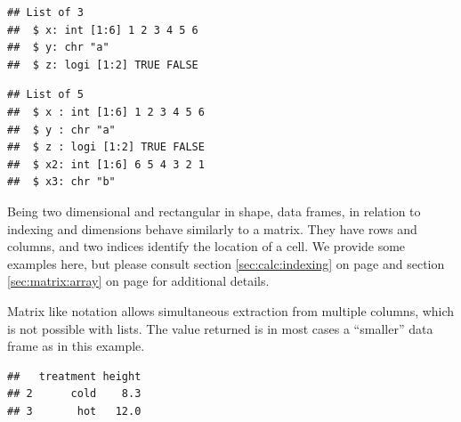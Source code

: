 \documentclass[krantz2]{krantz}\usepackage{knitr}
\begin{document}
\begin{knitrout}\footnotesize
{}\color{fgcolor}\begin{kframe}
\begin{alltt}
 \hlkwb{<-} \hlstd{(} \hlstd{=} \hlopt{:}\hlstd{,}  \hlstd{=} \hlstd{,}  \hlstd{=} \hlstd{(}\hlstd{,} \hlstd{))}
\end{alltt}
\begin{verbatim}
## List of 3
##  $ x: int [1:6] 1 2 3 4 5 6
##  $ y: chr "a"
##  $ z: logi [1:2] TRUE FALSE
\end{verbatim}
\begin{alltt}
\hlopt{$} \hlkwb{<-} \hlopt{:}
\hlopt{$} \hlkwb{<-} 
\end{alltt}
\begin{verbatim}
## List of 5
##  $ x : int [1:6] 1 2 3 4 5 6
##  $ y : chr "a"
##  $ z : logi [1:2] TRUE FALSE
##  $ x2: int [1:6] 6 5 4 3 2 1
##  $ x3: chr "b"
\end{verbatim}
\end{kframe}
\end{knitrout}

Being two dimensional and rectangular in shape, data frames, in relation to indexing and dimensions behave similarly to a matrix. They have rows and columns, and two indices identify the location of a cell. We provide some examples here, but please consult section \ref{sec:calc:indexing} on page \pageref{sec:calc:indexing} and section \ref{sec:matrix:array} on page \pageref{sec:matrix:array} for additional details.

Matrix like notation allows simultaneous extraction from multiple columns, which is not possible with lists. The value returned is in most cases a ``smaller'' data frame as in this example.

\begin{knitrout}\footnotesize
{}\color{fgcolor}\begin{kframe}
\begin{alltt}
\hlstd{a.df[}\hlopt{:}\hlstd{,} \hlopt{:}\hlstd{]}
\end{alltt}
\begin{verbatim}
##   treatment height
## 2      cold    8.3
## 3       hot   12.0
\end{verbatim}
\end{kframe}
\end{knitrout}
\end{document}

